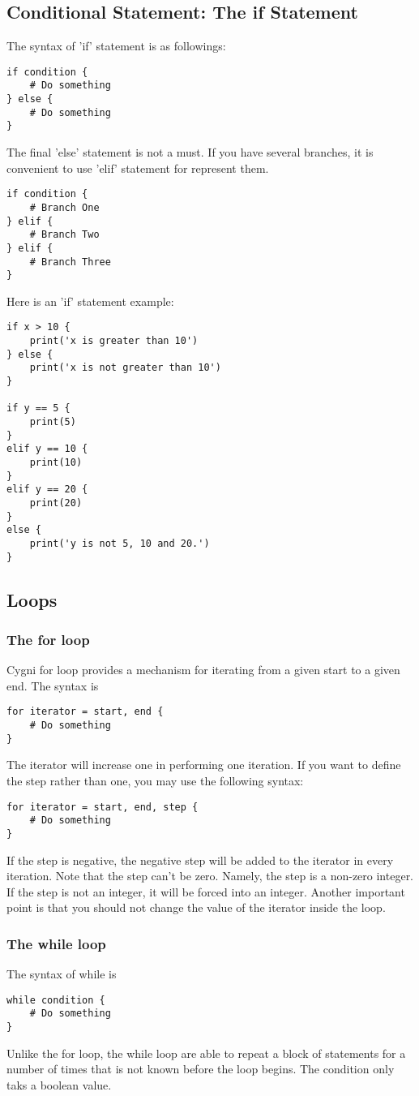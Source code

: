 \subsection{Conditional Statement: The if Statement}
The syntax of 'if' statement is as followings:
\begin{lstlisting}
if condition {
	# Do something
} else {
	# Do something
}
\end{lstlisting}
The final 'else' statement is not a must. If you have several branches, it is convenient to use 'elif' statement for represent them. 
\begin{lstlisting}
if condition {
	# Branch One 
} elif {
	# Branch Two 
} elif {
	# Branch Three
} 
\end{lstlisting}

Here is an 'if' statement example:
\begin{lstlisting}
if x > 10 {
	print('x is greater than 10')
} else {
	print('x is not greater than 10')
}

if y == 5 {
	print(5)
}
elif y == 10 {
	print(10)
}
elif y == 20 {
	print(20)
}
else {
	print('y is not 5, 10 and 20.')
}
\end{lstlisting}

\subsection{Loops}
\subsubsection{The for loop} 
Cygni for loop provides a mechanism for iterating from a given start to a given end. The syntax is
\begin{lstlisting}
for iterator = start, end {
	# Do something
}
\end{lstlisting}
The iterator will increase one in performing one iteration. If you want to define the step rather than one, you may use the following syntax:
\begin{lstlisting}
for iterator = start, end, step {
	# Do something
}
\end{lstlisting}
If the step is negative, the negative step will be added to the iterator in every iteration. Note that the step can't be zero. Namely, the step is a non-zero integer. If the step is not an integer, it will be forced into an integer. Another important point is that you should not change the value of the iterator inside the loop.

\subsubsection{The while loop}
The syntax of while is
\begin{lstlisting}
while condition {
	# Do something
}
\end{lstlisting}
Unlike the for loop, the while loop are able to repeat a block of statements for a number of times that is not known before the loop begins. The condition only taks a boolean value.
